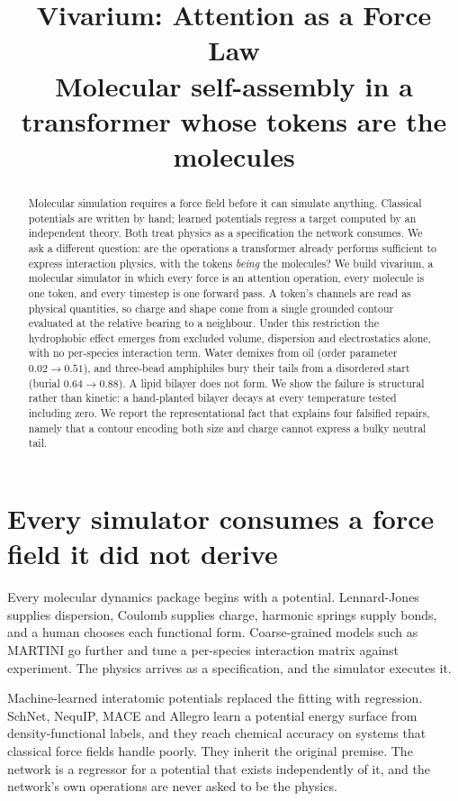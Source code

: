 \documentclass[10pt,twocolumn]{article}
\title{\vspace{-2em}Vivarium: Attention as a Force Law\\
{\large Molecular self-assembly in a transformer whose tokens are the molecules}}
\author{}
\date{}
\begin{document}
\maketitle

\begin{abstract}
Molecular simulation requires a force field before it can simulate anything. Classical potentials are
written by hand; learned potentials regress a target computed by an independent theory. Both treat
physics as a specification the network consumes. We ask a different question: are the operations a
transformer already performs sufficient to express interaction physics, with the tokens
\emph{being} the molecules? We build vivarium, a molecular simulator in which every force is an
attention operation, every molecule is one token, and every timestep is one forward pass. A token's
channels are read as physical quantities, so charge and shape come from a single grounded contour
evaluated at the relative bearing to a neighbour. Under this restriction the hydrophobic effect
emerges from excluded volume, dispersion and electrostatics alone, with no per-species interaction
term. Water demixes from oil (order parameter $0.02 \to 0.51$), and three-bead amphiphiles bury
their tails from a disordered start (burial $0.64 \to 0.88$). A lipid bilayer does not form. We show the
failure is structural rather than kinetic: a hand-planted bilayer decays at every temperature tested
including zero. We report the representational fact that explains four falsified repairs, namely that
a contour encoding both size and charge cannot express a bulky neutral tail.
\end{abstract}

\section{Every simulator consumes a force field it did not derive}

Every molecular dynamics package begins with a potential. Lennard-Jones supplies dispersion, Coulomb
supplies charge, harmonic springs supply bonds, and a human chooses each functional form. Coarse-grained
models such as MARTINI go further and tune a per-species interaction matrix against experiment. The
physics arrives as a specification, and the simulator executes it.

Machine-learned interatomic potentials replaced the fitting with regression. SchNet, NequIP, MACE and
Allegro learn a potential energy surface from density-functional labels, and they reach chemical
accuracy on systems that classical force fields handle poorly. They inherit the original premise. The
network is a regressor for a potential that exists independently of it, and the network's own
operations are never asked to be the physics.
\end{document}
